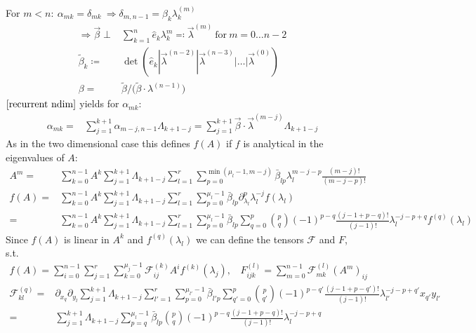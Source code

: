 \documentclass[12pt]{article}
\newcommand{\del}{\partial}
\begin{document}
For $m<n:\ \alpha_{mk} = \delta_{mk}\ \Rightarrow \delta_{m,n-1} = \beta_k \lambda_k^{(m)}$
\begin{align}
\Rightarrow \vec \beta \perp& \sum_{k=1}^n \hat e_k \lambda_k^m \eqqcolon \vec \lambda^{(m)} \ \text{for}\ m=0\dots n-2 \nonumber\\
\tilde\beta_k \coloneqq& \det(\hat e_k | \vec\lambda^{(n-2)} | \vec\lambda^{(n-3)} | \dots | \vec\lambda^{(0)})\nonumber\\
\beta =& \tilde\beta /\big( \tilde \beta \cdot \lambda^{(n-1)} \big)
\end{align}
$\eqref{recurrent ndim}$ yields for $\alpha_{mk}$:
\begin{align}
\alpha_{mk} =& \sum_{j=1}^{k+1} \alpha_{m-j,n-1} \Lambda_{k+1-j} = \sum_{j=1}^{k+1} \vec\beta\cdot\vec\lambda^{(m-j)} \Lambda_{k+1-j}
\end{align}
As in the two dimensional case this defines $f(A)$ if $f$ is analytical in the eigenvalues of $A$:
\begin{align}
A^m =& \sum_{k=0}^{n-1} A^k \sum_{j=1}^{k+1} \Lambda_{k+1-j} \sum_{l=1}^r \sum_{p=0}^{\min(\mu_l-1,m-j)} \bar\beta_{lp} \lambda_l^{m-j-p} \frac{(m-j)!}{(m-j-p)!}\\
f(A) =& \sum_{k=0}^{n-1} A^k \sum_{j=1}^{k+1} \Lambda_{k+1-j} \sum_{l=1}^r \sum_{p=0}^{\mu_l-1} \bar\beta_{lp} \del_{\lambda_l}^p \lambda_l^{-j} f(\lambda_l) \nonumber\\
=& \sum_{k=0}^{n-1} A^k \sum_{j=1}^{k+1} \Lambda_{k+1-j} \sum_{l=1}^r \sum_{p=0}^{\mu_l-1} \bar\beta_{lp} \sum_{q=0}^p \binom pq (-1)^{p-q}\frac{(j-1+p-q)!}{(j-1)!} \lambda_l^{-j-p+q} f^{(q)}(\lambda_l)
\end{align}
Since $f(A)$ is linear in $A^k$ and $f^{(q)}(\lambda_l)$ we can define the tensors $\mathcal F$ and $F$, s.t.
\begin{align}
f(A) = \sum_{i=0}^{n-1} \sum_{j=1}^r \sum_{k=0}^{\mu_j-1} \mathcal F_{ij}^{(k)} A^i f^{(k)}(\lambda_j),\ \ \ \ F_{ijk}^{(l)} = \sum_{m=0}^{n-1} \mathcal F_{mk}^{(l)} (A^m)_{ij}
\end{align}
\begin{align}
\mathcal F_{kl}^{(q)} =& \del_{x_q} \del_{y_l} \sum_{j=1}^{k+1} \Lambda_{k+1-j} \sum_{l'=1}^r \sum_{p=0}^{\mu_{l'}-1} \bar\beta_{l'p} \sum_{q'=0}^p \binom p{q'} (-1)^{p-q'}\frac{(j-1+p-q')!}{(j-1)!} \lambda_{l'}^{-j-p+q'} x_{q'} y_{l'} \nonumber\\
=& \sum_{j=1}^{k+1} \Lambda_{k+1-j} \sum_{p=q}^{\mu_l-1} \bar\beta_{lp} \binom pq (-1)^{p-q}\frac{(j-1+p-q)!}{(j-1)!} \lambda_l^{-j-p+q}
\end{align}
\end{document}
